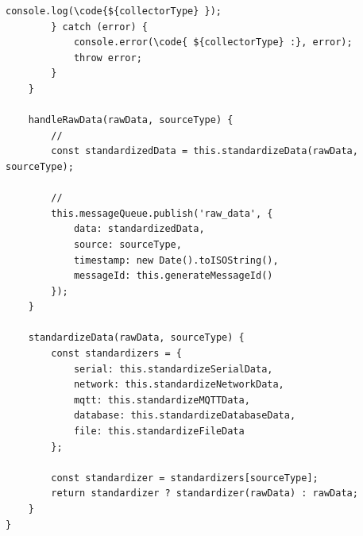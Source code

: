 \begin{lstlisting}[style=javascript]
            console.log(\code{${collectorType} });
        } catch (error) {
            console.error(\code{ ${collectorType} :}, error);
            throw error;
        }
    }
    
    handleRawData(rawData, sourceType) {
        // 
        const standardizedData = this.standardizeData(rawData, sourceType);
        
        // 
        this.messageQueue.publish('raw_data', {
            data: standardizedData,
            source: sourceType,
            timestamp: new Date().toISOString(),
            messageId: this.generateMessageId()
        });
    }
    
    standardizeData(rawData, sourceType) {
        const standardizers = {
            serial: this.standardizeSerialData,
            network: this.standardizeNetworkData,
            mqtt: this.standardizeMQTTData,
            database: this.standardizeDatabaseData,
            file: this.standardizeFileData
        };
        
        const standardizer = standardizers[sourceType];
        return standardizer ? standardizer(rawData) : rawData;
    }
}
\end{lstlisting}

\hypertarget{section-91}{%
\subsubsection{}\label{section-91}}

